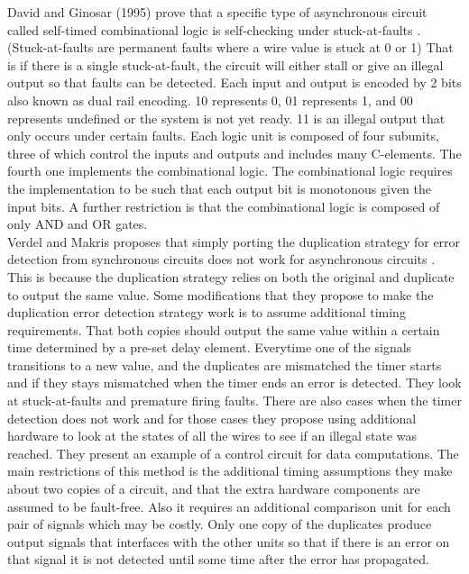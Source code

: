 \documentclass[12pt]{report}
\begin{document}
David and Ginosar (1995) prove that a specific type of asynchronous circuit called self-timed combinational logic is self-checking under stuck-at-faults \cite{self_timed}.  (Stuck-at-faults are permanent faults where a wire value is stuck at 0 or 1)  That is if there is a single stuck-at-fault, the circuit will either stall or give an illegal output so that faults can be detected.  Each input and output is encoded by 2 bits also known as dual rail encoding.  10 represents 0, 01 represents 1, and 00 represents undefined or the system is not yet ready.  11 is an illegal output that only occurs under certain faults.  Each logic unit is composed of four subunits, three of which control the inputs and outputs and includes many C-elements.  The fourth one implements the combinational logic.  The combinational logic requires the implementation to be such that each output bit is monotonous given the input bits.  A further restriction is that the combinational logic is composed of only AND and OR gates.
\\

Verdel and Makris proposes that simply porting the duplication strategy for error detection from synchronous circuits does not work for asynchronous circuits \cite{async_dup_ced}.  This is because the duplication strategy relies on both the original and duplicate to output the same value.  Some modifications that they propose to make the duplication error detection strategy work is to assume additional timing requirements.  That both copies should output the same value within a certain time determined by a pre-set delay element.  Everytime one of the signals transitions to a new value, and the duplicates are mismatched the timer starts and if they stays mismatched when the timer ends an error is detected.  They look at stuck-at-faults and premature firing faults.  There are also cases when the timer detection does not work and for those cases they propose using additional hardware to look at the states of all the wires to see if an illegal state was reached.  They present an example of a control circuit for data computations.  The main restrictions of this method is the additional timing assumptions they make about two copies of a circuit, and that the extra hardware components are assumed to be fault-free.  Also it requires an additional comparison unit for each pair of signals which may be costly.  Only one copy of the duplicates produce output signals that interfaces with the other units so that if there is an error on that signal it is not detected until some time after the error has propagated.
\\
\end{document}
